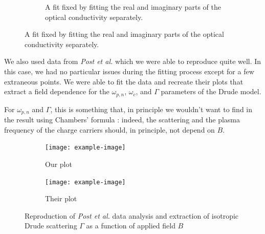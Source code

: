 \begin{figure}
\begin{subfigure}{0.49\textwidth}
        \caption{A fit fixed by fitting the real and imaginary parts of the optical conductivity
            separately.}
        \label{fig:drude_fit_bad}
    \end{subfigure}
\end{figure}

We also used data from \textit{Post et al.} which we were able to reproduce quite well. 
In this case, we had no particular issues during the fitting process except for a few extraneous points. 
We were able to fit the data and recreate their plots that extract a field dependence for the $\omega_{p,n}$, $\omega_c$, and $\Gamma$ parameters of the Drude model.

For $\omega_{p,n}$ and $\Gamma$, this is something that, in principle we wouldn't want to find in the result using Chambers' formula : 
indeed, the scattering and the plasma frequency of the charge carriers should, 
in principle, not depend on $B$.

\begin{figure}
\centering
\begin{subfigure}{0.45\textwidth}
    \texttt{[image: example-image]}
    \caption{Our plot}
    \label{fig:gamma_extraction_ours}
\end{subfigure}
\hfill
\begin{subfigure}{0.45\textwidth}
    \texttt{[image: example-image]}
    \caption{Their plot}
    \label{fig:gamma_extraction_theirs}
\end{subfigure}
        
\caption{Reproduction of \textit{Post et al.} data analysis and extraction of isotropic Drude scattering $\Gamma$ as a function of applied field $B$}
\label{fig:reproduction_post}
\end{figure}
